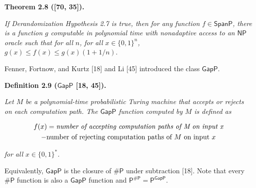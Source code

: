 \documentclass[10pt,a4paper]{article}
\begin{document}


\par\medskip\noindent\textbf{
\textbf{Theorem 2.8}\textbf{ }([70, 35])\textbf{.}
}\par



\emph{If Derandomization Hypothesis 2.7 is true,
then for any function $f\in\mathsf{SpanP}$,
there is a function $g$ computable in polynomial time with
nonadaptive access to an $\mathsf{NP}$ oracle such that for all
$n$, for all $x\in\{0,1\}^{n}$,
$g(x)\leq f(x)\leq g(x)(1+1/n).$}\par






Fenner, Fortnow, and Kurtz [18] and Li [45] introduced the class $\mathsf{GapP}$.\par





\par\medskip\noindent\textbf{
\textbf{Definition 2.9}\textbf{ }($\mathsf{GapP}$ [18, 45])\textbf{.}
}\par



\emph{Let $M$ be a polynomial-time probabilistic Turing machine that accepts or rejects on each computation path. The $\mathsf{GapP}$ function computed by $M$ is defined as}\par


\[\begin{gathered}
\displaystyle f(x) \displaystyle= \emph{number of accepting computation paths of M on input x} \\
\displaystyle-\textrm{number of rejecting computation paths of $M$ on input $x$}
\end{gathered}\]


\emph{for all $x\in\{0,1\}^{*}$.}\par






Equivalently, $\mathsf{GapP}$ is the closure of ${\mathsf{\#}\mathsf{P}}$ under subtraction [18]. Note that every ${\mathsf{\#}\mathsf{P}}$ function is also a $\mathsf{GapP}$ function and $\mathsf{P}^{\mathsf{\#}\mathsf{P}}=\mathsf{P}^{\mathsf{GapP}}$.\par
\end{document}
